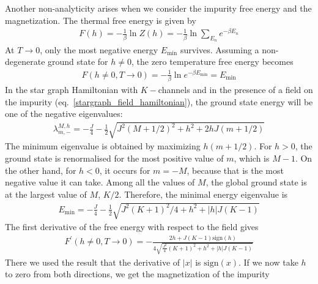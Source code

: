 \documentclass[reprint,prb,superscriptaddress]{revtex4-2}
\begin{document}
Another non-analyticity arises when we consider the impurity free energy and the magnetization. The thermal free energy is given by
\begin{equation}\begin{aligned}
	F(h) = -\frac{1}{\beta}\ln Z(h) = -\frac{1}{\beta}\ln\sum_{E_n}e^{-\beta E_n}
\end{aligned}\end{equation}
At \(T \to 0\), only the most negative energy \(E_\text{min}\) survives. Assuming a non-degenerate ground state for \(h \neq 0\), the zero temperature free energy becomes
\begin{equation}\begin{aligned}
	F(h\neq 0, T\to 0) = -\frac{1}{\beta}\ln e^{-\beta E_\text{min}} = E_\text{min}
\end{aligned}\end{equation}
In the star graph Hamiltonian with \(K-\)channels and in the presence of a field on the impurity (eq.~\ref{stargraph_field_hamiltonian}), the ground state energy will be one of the negative eigenvalues:
\begin{equation}\begin{aligned}
	\lambda^{M,h}_{m, -} = - \frac{J}{4} - \frac{1}{2}\sqrt{J^2(M+1/2)^2 + h^2 + 2hJ(m+1/2)}
\end{aligned}\end{equation}
The minimum eigenvalue is obtained by maximizing \(h(m+1/2)\). For \(h>0\), the ground state is renormalised for the most positive value of \(m\), which is \(M-1\). On the other hand, for \(h<0\), it occurs for \(m=-M\), because that is the most negative value it can take. Among all the values of \(M\), the global ground state is at the largest value of \(M\), \(K/2\). Therefore, the minimal energy eigenvalue is
\begin{equation}\begin{aligned}
	E_\text{min} = - \frac{J}{4} - \frac{1}{2}\sqrt{J^2(K+1)^2/4 + h^2 + |h|J(K-1)}
\end{aligned}\end{equation}
The first derivative of the free energy with respect to the field gives
\begin{equation}\begin{aligned}
	F^\prime(h\neq 0, T\to 0) =- \frac{2h + J(K-1)\text{sign}(h)}{4\sqrt{\frac{J^2}{4}(K+1)^2 + h^2 + |h|J(K-1)}}
\end{aligned}\end{equation}
There we used the result that the derivative of \(|x|\) is \(\text{sign}(x)\). If we now take \(h\) to zero from both directions, we get the magnetization of the impurity
\end{document}
